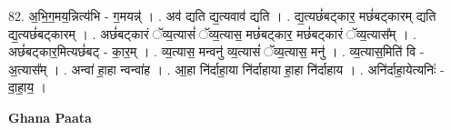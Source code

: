 \documentclass[17pt]{extarticle}
\begin{document}
82. अ॒भि॒ग॒मय॒न्नित्य॑भि - ग॒मयन्न्॑ । . अव॑ द्यति द्य॒त्यवाव॑ द्यति । . द्य॒त्यछं॑बट्कार॒ मछं॑बट्कारम् द्यति द्य॒त्यछं॑बट्कारम् । . अछं॑बट्कारं ॅव्य॒त्यासं॑ ॅव्य॒त्यास॒ मछं॑बट्कार॒ मछं॑बट्कारं ॅव्य॒त्यास᳚म् । . अछं॑बट्कार॒मित्यछं॑बट् - का॒र॒म् । . व्य॒त्यास॒ मन्वनु॑ व्य॒त्यासं॑ ॅव्य॒त्यास॒ मनु॑ । . व्य॒त्यास॒मिति॑ वि - अ॒त्यास᳚म् । . अन्वा॑ हा॒हा न्वन्वा॑ह । . आ॒हा नि॑र्दाहा॒या नि॑र्दाहाया हा॒हा नि॑र्दाहाय । . अनि॑र्दाहा॒येत्यनिः॑ - दा॒हा॒य॒ । \newline

\textbf{Ghana Paata } \newline
\end{document}
